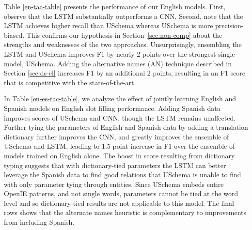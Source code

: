 
Table \ref{en-tac-table} presents the performance of our English models. First, observe that the LSTM substantially outperforms a CNN. Second, note that the LSTM achieves higher recall than USchema whereas USchema is more precision-biased. This confirms our hypothesis in Section~\ref{sec:non-comp} about the strengths and weaknesses of the two approaches. 
Unsurprisingly, ensembling the LSTM and USchema improves F1 by nearly 2 points over the strongest single model, USchema. Adding the alternative names (AN) technique described in Section \ref{sec:ds-el} increases F1 by an additional 2 points, resulting in an F1 score that is competitive with the state-of-the-art.

In Table \ref{en-es-tac-table}, we analyze the effect of jointly learning English and Spanish models on English slot filling performance.  Adding Spanish data improves scores of USchema and CNN, though the LSTM remains unaffected. Further tying the parameters of English and Spanish data by adding a translation dictionary further improves the CNN, and greatly improves the ensemble of USchema and LSTM, leading to 1.5 point increase in F1 over the ensemble of models trained on English alone. The boost in score resulting from dictionary typing suggests that with dictionary-tied parameters the LSTM can better leverage the Spanish data to find good relations that USchema is unable to find with only parameter tying through entities. Since USchema embeds entire OpenIE patterns, and not single words, parameters cannot be tied at the word level and so dictionary-tied results are not applicable to this model. The final rows shows that the alternate names heuristic is complementary to improvements from including Spanish. 

